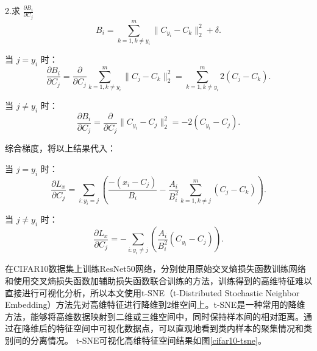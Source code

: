 2.求 \( \frac{\partial B_i}{\partial C_j} \)
\[
B_i = \sum_{k=1, k \neq y_i}^m \|C_{y_i} - C_k\|_2^2 + \delta.
\]

当 \( j = y_i \) 时：
\[
\frac{\partial B_i}{\partial C_j} = \frac{\partial}{\partial C_j} \sum_{k=1, k \neq y_i}^m \|C_j - C_k\|_2^2 = \sum_{k=1, k \neq y_i}^m 2 (C_j - C_k).
\]

当 \( j \neq y_i \) 时：
\[
\frac{\partial B_i}{\partial C_j} = \frac{\partial}{\partial C_j} \|C_{y_i} - C_j\|_2^2 = -2 (C_{y_i} - C_j).
\]


综合梯度，将以上结果代入：

当 \( j = y_i \) 时：
\[
\frac{\partial L_x}{\partial C_j} =  \sum_{i: y_i = j} \left( \frac{- (x_i - C_j)}{B_i} - \frac{A_i}{B_i^2} \sum_{k=1, k \neq j}^m  (C_j - C_k) \right).
\]

当 \( j \neq y_i \) 时：
\[
\frac{\partial L_x}{\partial C_j} = -\sum_{i: y_i \neq j} \left( \frac{A_i}{B_i^2} (C_{y_i} - C_j) \right).
\]


在CIFAR10数据集上训练ResNet50网络，分别使用原始交叉熵损失函数训练网络和使用交叉熵损失函数加辅助损失函数联合训练的方法，训练得到的高维特征难以直接进行可视化分析，所以本文使用t-SNE（t-Distributed Stochastic Neighbor Embedding）\cite{van2568visualizing}方法先对高维特征进行降维到2维空间上。t-SNE是一种常用的降维方法，能够将高维数据映射到二维或三维空间中，同时保持样本间的相对距离。通过在降维后的特征空间中可视化数据点，可以直观地看到类内样本的聚集情况和类别间的分离情况。
t-SNE可视化高维特征空间结果如图\ref{cifar10-tsne}。

